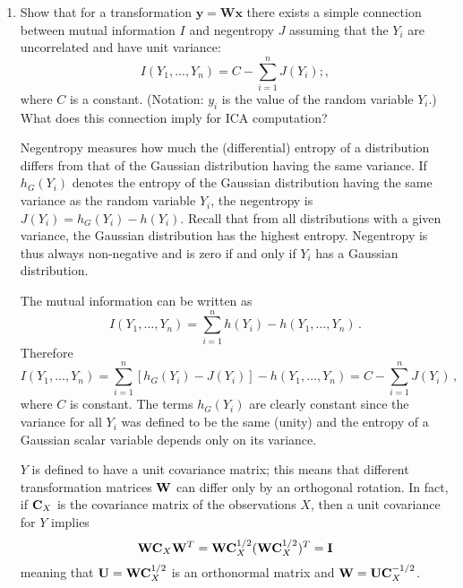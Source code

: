 \begin{enumerate}
\begin{solution}
  \end{solution}

  
\item Show that for a transformation $\mathbf{y} = \mathbf{W}
  \mathbf{x}$ there exists a simple connection between mutual information $I$
  and negentropy $J$ assuming that the $Y_i$ are uncorrelated and have
  unit variance:
  \[
  I(Y_1, \ldots , Y_n) = C - \sum_{i=1}^n J(Y_i) ; ,
  \]
  where $C$ is a constant. (Notation: $y_i$ is the value of the random
  variable $Y_i$.) What does this connection imply for ICA computation?

  \begin{solution}

    Negentropy measures how much the (differential) entropy of a distribution
    differs from that of the Gaussian distribution having the same
    variance.  If $h_G(Y_i)$ denotes the entropy of the Gaussian
    distribution having the same variance as the random variable $Y_i$,
    the negentropy is $J(Y_i) = h_G(Y_i) - h(Y_i)$.  Recall that from
    all distributions with a given variance, the Gaussian distribution
    has the highest entropy.  Negentropy is thus always non-negative and
    is zero if and only if $Y_i$ has a Gaussian distribution.

    The mutual information can be written as $$I(Y_1, \ldots, Y_n) =
    \sum_{i=1}^n h(Y_i) - h(Y_1, \ldots, Y_n) \, .$$ Therefore $$I(Y_1,
    \ldots, Y_n) = \sum_{i=1}^n [h_G(Y_i) - J(Y_i)] - h(Y_1, \ldots,
    Y_n) = C - \sum_{i=1}^n J(Y_i) \, ,$$ where $C$ is constant.  The
    terms $h_G(Y_i)$ are clearly constant since the variance for all
    $Y_i$ was defined to be the same (unity) and the entropy of a Gaussian
    scalar variable depends only on its variance.

    $Y$ is defined to have a unit covariance matrix; this means that
    different transformation matrices ${\bf W}$ can differ only by an
    orthogonal rotation. In fact, if ${\bf C}_X$ is the covariance matrix of the
    observations $X$, then a unit covariance for $Y$ implies  
    \begin{equation*}
      {\bf W} {\bf C}_X {\bf W}^T =  { \bf W} {\bf C}_X^{1/2} ( {\bf W} {\bf C}_X^{1/2} )^T =
      {\bf I}  
    \end{equation*}
    meaning that ${\bf U} = { \bf W} {\bf C}_X^{1/2}$ is an orthonormal matrix and
    ${ \bf W} = {\bf U} {\bf C}_X^{-1/2}$.


\end{solution}
\end{enumerate}
